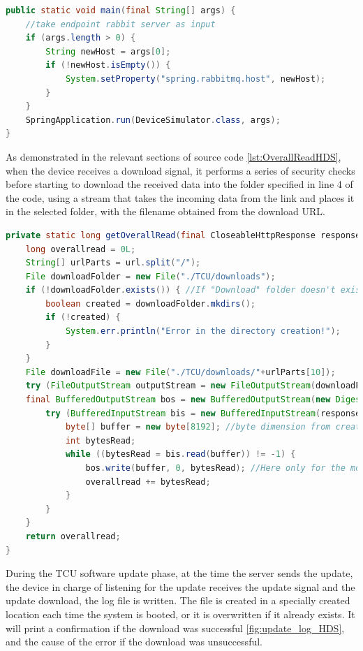 \lstset{numbers=left}
\begin{lstlisting}[language=Java, caption={Input arguments to set the ip of the OTA server to contact}, label=lst:ArgumentsHDS]
public static void main(final String[] args) {
    //take endpoint rabbit server as input
    if (args.length > 0) {
        String newHost = args[0];
        if (!newHost.isEmpty()) {
            System.setProperty("spring.rabbitmq.host", newHost);
        }
    }
    SpringApplication.run(DeviceSimulator.class, args);
}
\end{lstlisting}

As demonstrated in the relevant sections of source code \ref{lst:OverallReadHDS}, when the device receives a download signal, it performs a series of security checks before starting to download the received data into the folder specified in line 4 of the code, using a stream that takes the incoming data from the link and places it in the selected folder, with the filename obtained from the download URL.

\begin{lstlisting}[language=Java, caption={Downloading files from the OTA server to the specific device simulator folder}, label=lst:OverallReadHDS]
private static long getOverallRead(final CloseableHttpResponse response, final MessageDigest md, final String url) throws IOException {
    long overallread = 0L;
    String[] urlParts = url.split("/");
    File downloadFolder = new File("./TCU/downloads");
    if (!downloadFolder.exists()) { //If "Download" folder doesn't exist
        boolean created = downloadFolder.mkdirs();
        if (!created) {
            System.err.println("Error in the directory creation!");
        }
    }
    File downloadFile = new File("./TCU/downloads/"+urlParts[10]);
    try (FileOutputStream outputStream = new FileOutputStream(downloadFile);
    final BufferedOutputStream bos = new BufferedOutputStream(new DigestOutputStream(outputStream, md))) {
        try (BufferedInputStream bis = new BufferedInputStream(response.getEntity().getContent())) {
            byte[] buffer = new byte[8192]; //byte dimension from createBuffer of ByteStream.class
            int bytesRead;
            while ((bytesRead = bis.read(buffer)) != -1) {
                bos.write(buffer, 0, bytesRead); //Here only for the md hash correctness.
                overallread += bytesRead;
            }
        }
    }
    return overallread;
}
\end{lstlisting}

During the TCU software update phase, at the time the server sends the update, the device in charge of listening for the update receives the update signal and the update download, the log file is written. The file is created in a specially created location each time the system is booted, or it is overwritten if it already exists. It will print a confirmation if the download was successful \ref{fig:update_log_HDS}, and the cause of the error if the download was unsuccessful.

